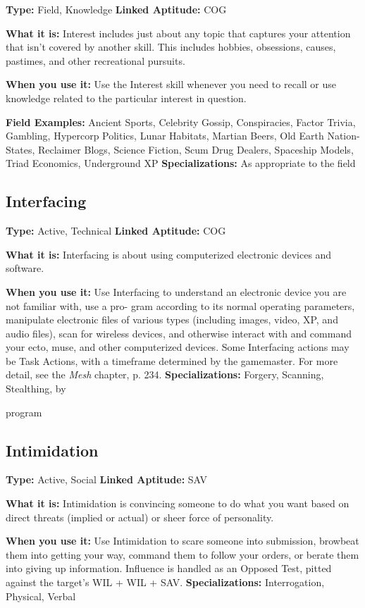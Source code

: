 \textbf{Type:} Field, Knowledge
\textbf{Linked Aptitude:} COG

\textbf{What it is:} Interest includes just about any topic 
that captures your attention that isn't covered by 
another skill. This includes hobbies, obsessions, 
causes, pastimes, and other recreational pursuits.

\textbf{When you use it:} Use the Interest skill whenever 
you need to recall or use knowledge related to the 
particular interest in question.

\textbf{Field Examples:} Ancient Sports, Celebrity Gossip, 
Conspiracies, Factor Trivia, Gambling, Hypercorp 
Politics, Lunar Habitats, Martian Beers, Old Earth 
Nation-States, Reclaimer Blogs, Science Fiction, Scum 
Drug Dealers, Spaceship Models, Triad Economics, 
Underground XP
\textbf{Specializations:} As appropriate to the field

\subsection{Interfacing}

\textbf{Type:} Active, Technical
\textbf{Linked Aptitude:} COG

\textbf{What it is:} Interfacing is about using computerized 
electronic devices and software.

\textbf{When you use it:} Use Interfacing to understand an 
electronic device you are not familiar with, use a pro-
gram according to its normal operating parameters, 
manipulate electronic files of various types (including 
images, video, XP, and audio files), scan for wireless 
devices, and otherwise interact with and command 
your ecto, muse, and other computerized devices. 
Some Interfacing actions may be Task Actions, with 
a timeframe determined by the gamemaster. For more 
detail, see the \textit{Mesh} chapter, p. 234.
\textbf{Specializations:} Forgery, Scanning, Stealthing, by 

program

\subsection{Intimidation}

\textbf{Type:} Active, Social
\textbf{Linked Aptitude:} SAV

\textbf{What it is:} Intimidation is convincing someone to 
do what you want based on direct threats (implied or 
actual) or sheer force of personality.

\textbf{When you use it:} Use Intimidation to scare someone 
into submission, browbeat them into getting your way, 
command them to follow your orders, or berate them 
into giving up information. Influence is handled as an 
Opposed Test, pitted against the target's WIL + WIL 
+ SAV.
\textbf{Specializations:} Interrogation, Physical, Verbal


